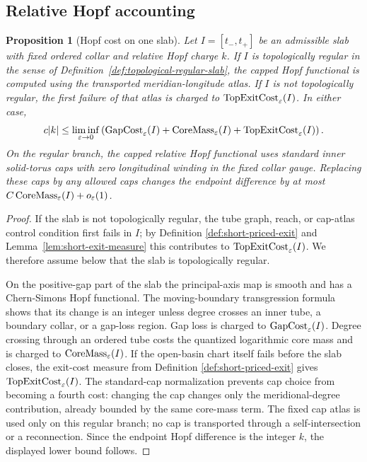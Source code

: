 \documentclass[11pt]{article}
\newtheorem{proposition}[theorem]{Proposition}
\theoremstyle{definition}
\newcommand{\eps}{\varepsilon}
\begin{document}
\subsection{Relative Hopf accounting}

\begin{proposition}[Hopf cost on one slab]
\label{prop:short-hopf}
Let \(I=[t_-,t_+]\) be an admissible slab with fixed ordered collar and relative
Hopf charge \(k\).  If \(I\) is topologically regular in the sense of
Definition~\ref{def:topological-regular-slab}, the capped Hopf functional is
computed using the transported meridian-longitude atlas.  If \(I\) is not
topologically regular, the first failure of that atlas is charged to
\({\rm TopExitCost}_\eps(I)\).  In either case,
\[
        c|k|
        \le
        \liminf_{\eps\to0}
        \left(
        {\rm GapCost}_\eps(I)
        +
        {\rm CoreMass}_\eps(I)
        +
        {\rm TopExitCost}_\eps(I)
        \right).
\]
On the regular branch, the capped relative Hopf functional uses standard inner
solid-torus caps with zero longitudinal winding in the fixed collar gauge.
Replacing these caps by any allowed caps changes the endpoint difference by at
most \(C\,{\rm CoreMass}_\eps(I)+o_\eps(1)\).
\end{proposition}

\begin{proof}
If the slab is not topologically regular, the tube graph, reach, or cap-atlas
control condition first fails in \(I\); by Definition
\ref{def:short-priced-exit} and Lemma~\ref{lem:short-exit-measure} this
contributes to \({\rm TopExitCost}_\eps(I)\).  We therefore assume below that
the slab is topologically regular.

On the positive-gap part of the slab the principal-axis map is smooth and has a
Chern-Simons Hopf functional.  The moving-boundary transgression formula shows
that its change is an integer unless degree crosses an inner tube, a boundary
collar, or a gap-loss region.  Gap loss is charged to
\({\rm GapCost}_\eps(I)\).  Degree crossing through an ordered tube costs the
quantized logarithmic core mass and is charged to
\({\rm CoreMass}_\eps(I)\).  If the open-basin chart itself fails before the
slab closes, the exit-cost measure from Definition
\ref{def:short-priced-exit} gives \({\rm TopExitCost}_\eps(I)\).  The
standard-cap normalization prevents cap choice from becoming a fourth cost:
changing the cap changes only the meridional-degree contribution, already
bounded by the same core-mass term.  The fixed cap atlas is used only on this
regular branch; no cap is transported through a self-intersection or a
reconnection.  Since the endpoint Hopf difference is the integer \(k\), the
displayed lower bound follows.
\end{proof}
\end{document}
